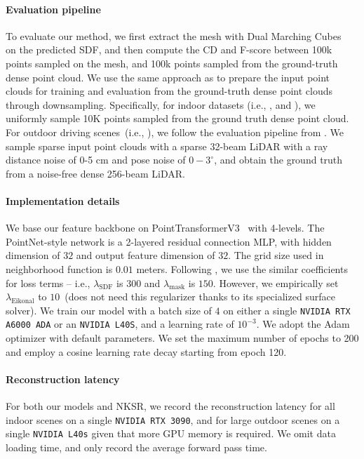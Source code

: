 

\paragraph{Evaluation pipeline}
To evaluate our method, we first extract the mesh with Dual Marching Cubes~\cite{schaefer2004dual} on the predicted SDF, and then compute the CD and F-score between 100k points sampled on the mesh, and 100k points sampled from the ground-truth dense point cloud.
We use the same approach as \nksr to prepare the input point clouds for training and evaluation from the ground-truth dense point clouds through downsampling.
Specifically, for indoor datasets (i.e., \synthetic, 
\scannet and \scenenn), we uniformly sample 10K points sampled from the ground truth dense point cloud. 
For outdoor driving scenes~(i.e., \carla), we follow the evaluation pipeline from \nksr.
We sample sparse input point clouds with a sparse 32-beam LiDAR with a ray distance noise of 0-5 cm and pose noise of $0-3^\circ$, and obtain the ground truth from a noise-free dense 256-beam LiDAR.

 
  

\paragraph{Implementation details}
We base our feature backbone on PointTransformerV3~\cite{wu2024point} with 4-levels.
The PointNet-style network is a 2-layered residual connection MLP, with hidden dimension of $32$ and output feature dimension of $32$.    
The grid size used in neighborhood function is $0.01$ meters.
Following \nksr, we use the similar coefficients for loss terms -- i.e., $\lambda_{\text{SDF}}$ is $300$ and $\lambda_{\text{mask}}$ is $150$.
However, we empirically set $\lambda_{\text{Eikonal}}$ to $10$~(\nksr does not need this regularizer thanks to its specialized surface solver).
We train our model with a batch size of $4$ on either a single \texttt{NVIDIA RTX A6000 ADA} or an \texttt{NVIDIA L40S}, and a learning rate of $10^{-3}$.
We adopt the Adam optimizer with default parameters.
We set the maximum number of epochs to 200 and employ a cosine learning rate decay starting from epoch 120.




\paragraph{Reconstruction latency}
For both our models and NKSR, we record the reconstruction latency for all indoor scenes on a single \texttt{NVIDIA RTX 3090}, and for large outdoor scenes on a single \texttt{NVIDIA L40s} given that more GPU memory is required.
We omit data loading time, and only record the average forward pass time. 

